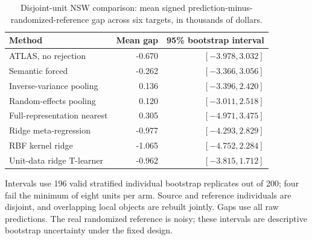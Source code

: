 \begin{table}[htbp]
\centering\small
\setlength{\tabcolsep}{4pt}
\caption{Disjoint-unit NSW comparison: mean signed prediction-minus-randomized-reference gap across six targets, in thousands of dollars.}
\label{tab:ext-reference}
\begin{tabular}{lrr}
\toprule
Method & Mean gap & 95\% bootstrap interval \\
\midrule
ATLAS, no rejection & -0.670 & $[-3.978, 3.032]$ \\
Semantic forced & -0.262 & $[-3.366, 3.056]$ \\
Inverse-variance pooling & 0.136 & $[-3.396, 2.420]$ \\
Random-effects pooling & 0.120 & $[-3.011, 2.518]$ \\
Full-representation nearest & 0.305 & $[-4.971, 3.475]$ \\
Ridge meta-regression & -0.977 & $[-4.293, 2.829]$ \\
RBF kernel ridge & -1.065 & $[-4.752, 2.284]$ \\
Unit-data ridge T-learner & -0.962 & $[-3.815, 1.712]$ \\
\bottomrule
\end{tabular}
\par\smallskip\begin{minipage}{0.97\linewidth}\footnotesize Intervals use 196 valid stratified individual bootstrap replicates out of 200; four fail the minimum of eight units per arm. Source and reference individuals are disjoint, and overlapping local objects are rebuilt jointly. Gaps use all raw predictions. The real randomized reference is noisy; these intervals are descriptive bootstrap uncertainty under the fixed design.\end{minipage}
\end{table}
